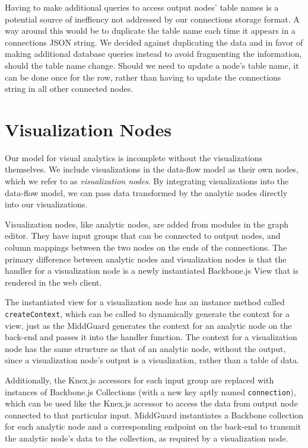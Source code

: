 \documentclass[midd]{thesis}
\begin{document}
Having to make additional queries to access output nodes' table names is a
potential source of ineffiency not addressed by our connections storage format.
A way around this would be to duplicate the table name each time it appears in a
connections JSON string. We decided against duplicating the data and in favor of
making additional database queries instead to avoid fragmenting the information,
should the table name change. Should we need to update a node's table name, it
can be done once for the row, rather than having to update the connections
string in all other connected nodes.

\section{Visualization Nodes}

Our model for visual analytics is incomplete without the visualizations
themselves. We include visualizations in the data-flow model as their own nodes,
which we refer to as \textit{visualization nodes}. By integrating visualizations
into the data-flow model, we can pass data transformed by the analytic nodes
directly into our visualizations.

Visualization nodes, like analytic nodes, are added from modules in the graph
editor. They have input groups that can be connected to output nodes, and column
mappings between the two nodes on the ends of the connections. The primary
difference between analytic nodes and visualization nodes is that the handler
for a visualization node is a newly instantiated Backbone.js View
\cite{backbone} that is rendered in the web client.

The instantiated view for a visualization node has an instance method called\\
\texttt{createContext}, which can be called to dynamically generate the context
for a view, just as the MiddGuard generates the context for an analytic node on
the back-end and passes it into the handler function. The context for a
visualization node has the same structure as that of an analytic node, without
the output, since a visualization node's output is a visualization, rather than
a table of data.

Additionally, the Knex.js accessors for each input group are replaced with
instances of Backbone.js Collections (with a new key aptly named
\texttt{connection}), which can be used like the Knex.js accessor to access the
data from output node connected to that particular input. MiddGuard instantiates
a Backbone collection for each analytic node and a corresponding endpoint on the
back-end to transmit the analytic node's data to the collection, as required by
a visualization node.
\end{document}
